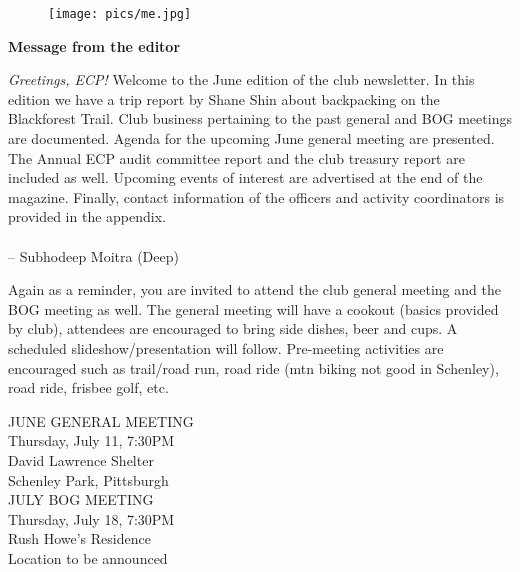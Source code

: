 \documentclass[10pt,a4paper]{article}
\newcommand{\NewsItem}[1]{%
		\usefont{T1}{augie}{m}{n} 	
		\large \bf #1 \vspace{4pt}
		\par \normalsize \normalfont}
\begin{document}
\begin{center}
\begin{minipage}[h]{0.8\linewidth}
	\begin{wrapfigure}{l}{0.41\textwidth}
		\texttt{[image: pics/me.jpg]}
		\\%
	\end{wrapfigure}
	
	\NewsItem{Message from the editor}

	\emph{Greetings, ECP!} Welcome to the June edition of the club newsletter. In this edition we have a trip report by Shane Shin about backpacking on the Blackforest Trail. Club business pertaining to the past general and BOG meetings are documented. Agenda for the upcoming June general meeting are presented. The Annual ECP audit committee report and the club treasury report are included as well.  Upcoming events of interest are advertised at the end of the magazine. Finally, contact information of the officers and activity coordinators is provided in the appendix. 
\\
\\
-- Subhodeep Moitra (Deep)

\vspace{0.5cm}



	Again as a reminder, you are invited to attend the club general meeting and the BOG meeting as well. The general meeting will have a cookout (basics provided by club), attendees are encouraged to bring side dishes, beer and cups. A scheduled slideshow/presentation will follow. Pre-meeting activities are encouraged such as trail/road run, road ride (mtn biking not good in Schenley), road ride, frisbee golf, etc. 
	
\vspace{1cm}

\begin{multicols}{2}
\Large



JUNE GENERAL MEETING\\
Thursday, July 11, 7:30PM\\
David Lawrence Shelter\\
Schenley Park, Pittsburgh
\\
JULY BOG MEETING\\
Thursday, July 18, 7:30PM\\
Rush Howe's Residence \\ 
Location to be announced

\normalsize
\end{multicols}
	
\end{minipage}
\end{center}
\end{document}
